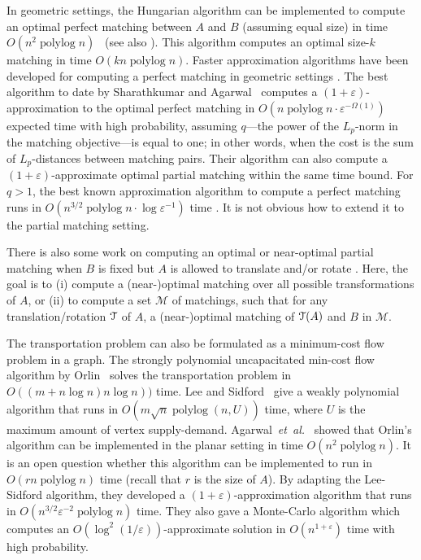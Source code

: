 \documentclass[a4paper,UKenglish]{socg-lipics-v2018}
\makeatletter
\def\etal{\emph{et~al.}}
\def\etal{\textit{et~al.}}
\def\polylog{\mathop{\mathrm{polylog}}}
\def\eps{\varepsilon}
\theoremstyle{plain}
\numberwithin{figure}{section}
\def\n@te#1{\textsf{\boldmath \textbf{$\langle\!\langle$#1$\rangle\!\rangle$}}\leavevmode}
\def\note#1{\textcolor{red}{\n@te{#1}}}
\renewcommand{\note}[1]{} %
\makeatother
\begin{document}
In geometric settings, the Hungarian algorithm can be implemented to compute
an optimal perfect matching between $A$ and $B$ (assuming equal size)
in time $O(n^2\polylog n)$~\cite{KMRSS17} (see also \cite{Vaidya89,AES99}).
This algorithm computes an optimal size-$k$ matching in time $O(kn\polylog n)$.
Faster approximation algorithms have been developed for computing a perfect
matching in geometric settings \cite{Vaidya89,V98,AV04,SA12}.
The best algorithm to date by Sharathkumar and Agarwal~\cite{SA12m}
computes a $(1+\eps)$-approximation to the optimal perfect matching in
$O(n\polylog n \cdot \eps^{-\Omega(1)})$ expected time with high probability,
assuming $q$---the power of the $L_p$-norm in the matching objective---is equal to one;
in other words, when the cost is the sum of $L_p$-distances between
matching pairs.
Their algorithm can also compute a $(1+\eps)$-approximate optimal partial
matching within the same time bound.
For $q > 1$, the best known approximation algorithm to compute a perfect
matching runs in $O(n^{3/2}\polylog n \cdot \log\eps^{-1})$ time \cite{SA12}.
It is not obvious how to extend it to the partial matching setting.

There is also some work on computing an optimal or near-optimal partial
matching when $B$ is fixed but $A$ is allowed to translate and/or rotate
\cite{CGKR08,R10,AHJKRST18,AKKMRSX18}.
Here, the goal is to (i) compute a (near-)optimal matching over all possible
transformations of $A$, or (ii) to compute a set $\mathcal{M}$ of matchings,
such that for any translation/rotation $\EuScript{T}$ of $A$, a (near-)optimal
matching of $\EuScript{T}(A)$ and $B$ in $\mathcal{M}$.

The transportation problem can also be formulated as a minimum-cost flow
problem in a graph.
The strongly polynomial uncapacitated min-cost flow algorithm by
Orlin~\cite{O93} solves the transportation problem in
$O((m + n\log n)n\log n))$ time.
Lee and Sidford~\cite{LS13b} give a weakly polynomial algorithm that runs in
$O(m\sqrt{n}\polylog(n, U))$ time, where $U$ is the maximum amount of vertex supply-demand.
Agarwal~\etal~\cite{AFPVX17} showed that Orlin's algorithm can be
implemented in the planar setting in time $O(n^2\polylog n)$.
It is an open question whether this algorithm can be implemented to run in
$O(rn\polylog n)$ time (recall that $r$ is the size of $A$).
By adapting the Lee-Sidford algorithm, they developed a
$(1+\eps)$-approximation algorithm that runs in $O(n^{3/2}\eps^{-2}\polylog n)$ time.
They also gave a Monte-Carlo algorithm which computes an
$O(\log^2(1/\eps))$-approximate solution in $O(n^{1+\eps})$ time with
high probability.
\end{document}
